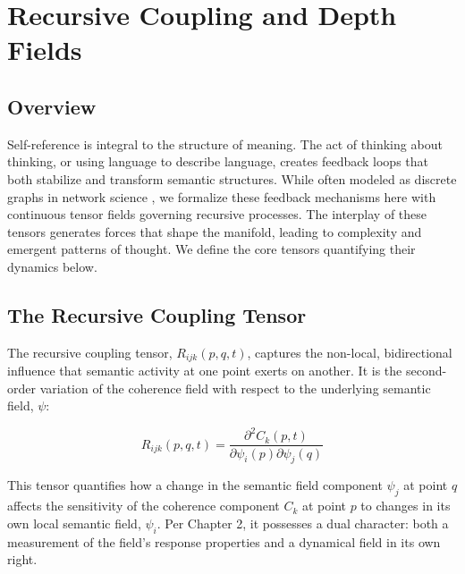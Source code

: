 \chapter{Recursive Coupling and Depth Fields}
\label{ch:recursive_coupling_and_depth_fields}


\section{Overview}

Self-reference is integral to the structure of meaning. The act of thinking about thinking, or using language to describe language, creates feedback loops that both stabilize and transform semantic structures. While often modeled as discrete graphs in network science \autocite{Barabasi2016}, we formalize these feedback mechanisms here with continuous tensor fields governing recursive processes. The interplay of these tensors generates forces that shape the manifold, leading to complexity and emergent patterns of thought. We define the core tensors quantifying their dynamics below.


\section{The Recursive Coupling Tensor}
\label{sec:the_recursive_coupling_tensor}

The recursive coupling tensor, \(R_{ijk}(p, q, t)\), captures the non-local, bidirectional influence that semantic activity at one point exerts on another. It is the second-order variation of the coherence field with respect to the underlying semantic field, \(\psi\):

\begin{equation}
R_{ijk}(p, q, t) = \frac{\partial^2 C_k(p,t)}{\partial \psi_i(p) \partial \psi_j(q)}
\end{equation}

This tensor quantifies how a change in the semantic field component \(\psi_j\) at point \(q\) affects the sensitivity of the coherence component \(C_k\) at point \(p\) to changes in its own local semantic field, \(\psi_i\). Per Chapter 2, it possesses a dual character: both a measurement of the field's response properties and a dynamical field in its own right.

